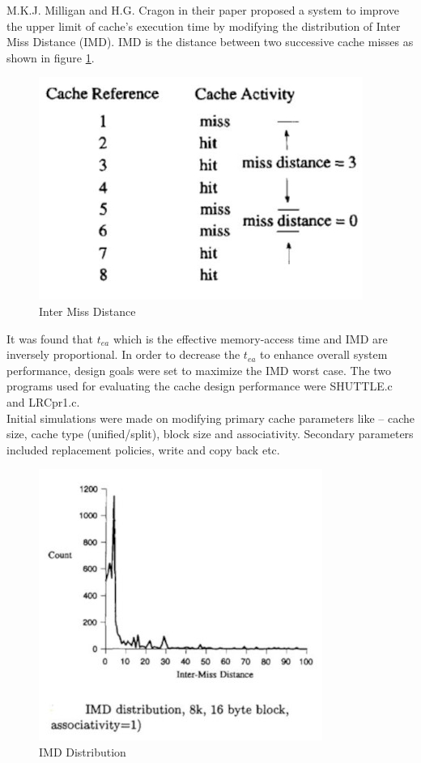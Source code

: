 \documentclass[conference]{IEEEtran}
\begin{document}
    M.K.J. Milligan and H.G. Cragon in their paper proposed a system to improve the upper limit of cache’s execution time by modifying the distribution of Inter Miss Distance (IMD). IMD is the distance between two successive cache misses as shown in figure \ref{fig_a_1}.
    
    \begin{figure}[htbp]
        \centerline{\includegraphics{Inter_Miss_Distance.JPG}}
        \caption{Inter Miss Distance\cite{b1}}
        \label{fig_a_1}
    \end{figure}
    It was found that $t_{ea}$ which is the effective memory-access time and IMD are inversely proportional. In order to decrease the $t_{ea}$ to enhance overall system performance, design goals were set to maximize the IMD worst case. The two programs used for evaluating the cache design performance were SHUTTLE.c and LRCpr1.c.\\
    Initial simulations were made on modifying primary cache parameters like – cache size, cache type (unified/split), block size and associativity. Secondary parameters included replacement policies, write and copy back etc.
    \begin{figure}[htbp]
        \centerline{\includegraphics{IMD_Distribution.JPG}}
        \caption{IMD Distribution\cite{b1}}
        \label{fig_a_2}
    \end{figure}
\end{document}
